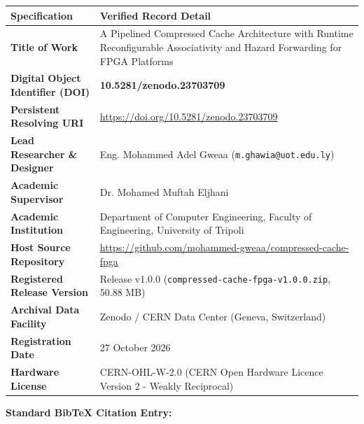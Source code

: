 \documentclass[10pt,a4paper]{article}
\begin{document}
\noindent
\renewcommand{\arraystretch}{1.25}
\begin{tabularx}{\linewidth}{@{}>{\bfseries}p{4.2cm} X@{}}
\toprule
Specification & Verified Record Detail \\
\midrule
Title of Work & A Pipelined Compressed Cache Architecture with Runtime Reconfigurable Associativity and Hazard Forwarding for FPGA Platforms \\
Digital Object Identifier (DOI) & \textbf{10.5281/zenodo.23703709} \\
Persistent Resolving URI & \url{https://doi.org/10.5281/zenodo.23703709} \\
Lead Researcher \& Designer & Eng. Mohammed Adel Gweaa (\texttt{m.ghawia@uot.edu.ly}) \\
Academic Supervisor & Dr. Mohamed Muftah Eljhani \\
Academic Institution & Department of Computer Engineering, Faculty of Engineering, University of Tripoli \\
Host Source Repository & \url{https://github.com/mohammed-gweaa/compressed-cache-fpga} \\
Registered Release Version & Release v1.0.0 (\texttt{compressed-cache-fpga-v1.0.0.zip}, 50.88 MB) \\
Archival Data Facility & Zenodo / CERN Data Center (Geneva, Switzerland) \\
Registration Date & 27 October 2026 \\
Hardware License & CERN-OHL-W-2.0 (CERN Open Hardware Licence Version 2 - Weakly Reciprocal) \\
\bottomrule
\end{tabularx}

\vspace{4mm}

\noindent \textbf{Standard BibTeX Citation Entry:}
\vspace{1.5mm}
\end{document}
